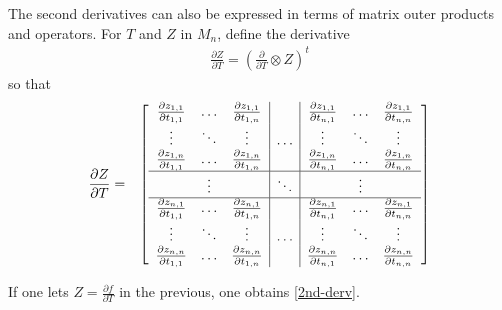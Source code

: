 \documentclass{report}
\begin{document}
\noindent The second derivatives can also be expressed in terms of 
matrix outer products and operators. For $T$ and $Z$ in $M_n$, define the 
derivative
\begin{eqnarray}
\frac{\partial Z}{\partial T} = \left( \frac{\partial}{\partial T} \otimes Z \right)^t
\end{eqnarray}
so that 
\begin{eqnarray}
\frac{\partial Z}{\partial T} & = &
\left[ \begin{array}{ccc|c|ccc}
\frac{\partial z_{1,1}}{\partial t_{1,1}} &
\ldots &
\frac{\partial z_{1,1}}{\partial t_{1,n}} &
&
\frac{\partial z_{1,1}}{\partial t_{n,1}} &
\ldots &
\frac{\partial z_{1,1}}{\partial t_{n,n}} \\
\vdots & \ddots & \vdots &
\ldots &
\vdots & \ddots & \vdots \\
\frac{\partial z_{1,n}}{\partial t_{1,1}} &
\ldots &
\frac{\partial z_{1,n}}{\partial t_{1,n}} &
&
\frac{\partial z_{1,n}}{\partial t_{n,1}} &
\ldots &
\frac{\partial z_{1,n}}{\partial t_{n,n}} \\
\hline
& \vdots & & \ddots & & \vdots \\
\hline
\frac{\partial z_{n,1}}{\partial t_{1,1}} &
\ldots &
\frac{\partial z_{n,1}}{\partial t_{1,n}} &
&
\frac{\partial z_{n,1}}{\partial t_{n,1}} &
\ldots &
\frac{\partial z_{n,1}}{\partial t_{n,n}} \\
\vdots & \ddots & \vdots &
\ldots &
\vdots & \ddots & \vdots \\
\frac{\partial z_{n,n}}{\partial t_{1,1}} &
\ldots &
\frac{\partial z_{n,n}}{\partial t_{1,n}} &
&
\frac{\partial z_{n,n}}{\partial t_{n,1}} &
\ldots &
\frac{\partial z_{n,n}}{\partial t_{n,n}} 
\end{array} \right] 
\end{eqnarray}

\noindent If one lets $Z = \frac{\partial f}{\partial T}$ in the previous,
one obtains \ref{2nd-derv}. \newline

 \newline
\end{document}
